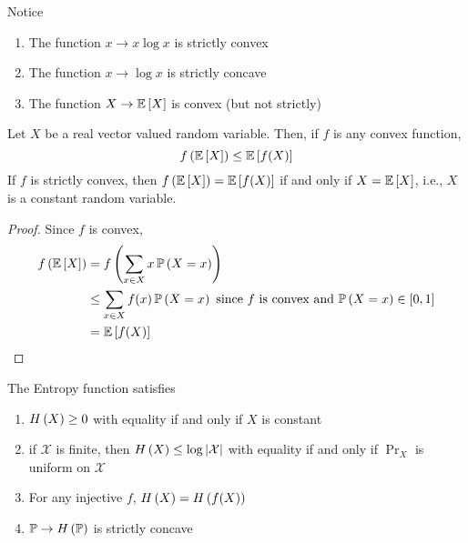 \begin{example}
    Notice
    \begin{enumerate}[label=(\arabic*)]
        \item The function $x \to x\log{x}$ is strictly convex
        \item The function $x \to \log{x}$ is strictly concave
        \item The function $X \to \expectation{X}$ is convex (but not strictly)
    \end{enumerate}
\end{example}

\begin{theorem}
    Let $X$ be a real vector valued random variable. Then, if $f$ is any convex
    function,
    \[f\left(\expectation{X}\right) \leq \expectation{f(X)}\]
    If $f$ is strictly convex, then $f\left(\expectation{X}\right) = \expectation{f(X)}$
    if and only if $X = \expectation{X}$, i.e., $X$ is a constant random variable.
\end{theorem}

\begin{proof}
    Since $f$ is convex,
    \begin{align*}f\left(\expectation{X}\right)
         & = f\left(\sum_{x \in X}x\prob{X = x}\right)                                                  \\
         & \leq \sum_{x \in X}f(x)\prob{X = x}\hbox{ since $f$ is convex and $\prob{X = x} \in [0, 1]$} \\
         & = \expectation{f(X)}\qedhere
    \end{align*}
\end{proof}

\begin{theorem}
    The Entropy function satisfies
    \begin{enumerate}[label=(\arabic*)]
        \item $H\left(X\right) \geq 0$ with equality if and only if $X$ is constant
        \item if $\mathcal{X}$ is finite, then $H\left(X\right) \leq \log\left\lvert\mathcal{X}\right\rvert$ with
              equality if and only if $\Pr_X$ is uniform on $\mathcal{X}$
        \item For any injective $f$, $H\left(X\right) = H\left(f(X)\right)$
        \item $\mathbb{P} \to H\left(\mathbb{P}\right)$ is strictly concave
    \end{enumerate}
\end{theorem}

